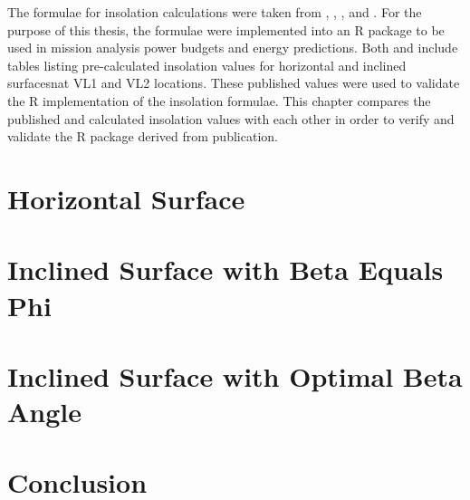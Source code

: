 The formulae for insolation calculations were taken from , , , and . For the purpose of this thesis, the formulae were implemented into an R package to be used in mission analysis power budgets and energy predictions. Both  and  include tables listing pre-calculated insolation values for horizontal and inclined surfacesnat \ac{VL1} and \ac{VL2} locations. These published values were used to validate the R implementation of the insolation formulae. This chapter compares the published and calculated insolation values with each other in order to verify and validate the R package derived from publication.


\section{Horizontal Surface}

\clearpage

\section{Inclined Surface with Beta Equals Phi}

\clearpage

\section{Inclined Surface with Optimal Beta Angle}

\clearpage

\section{Conclusion}

\clearpage
